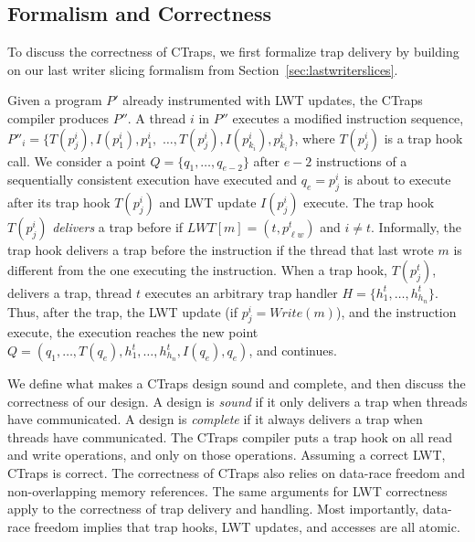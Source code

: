 \documentclass[preprint,9pt]{sigplanconf}
\newcommand{\ctraps}{CTraps\xspace}
\newcommand{\lwt}{LWT\xspace}
\begin{document}
\subsection{Formalism and Correctness}
\label{sec:ctsoundness}
To discuss the correctness of \ctraps, we first formalize trap delivery by
building on our last writer slicing formalism from
Section~\ref{sec:lastwriterslices}.  

Given a program $P'$ already instrumented with \lwt updates, the \ctraps
compiler produces $P''$. A thread $i$ in $P''$ executes a modified instruction
sequence, $P''_{i} = \{ T(p^{i}_{j}), I(p^{i}_{1}), p^{i}_{1},$ $\ldots,
T(p^{i}_{j}), I(p^{i}_{k_{i}}), p^{i}_{k_{i}} \}$, where $T(p^{i}_{j})$ is a
trap hook call.  We consider a point $Q = \{q_1, \ldots, q_{e-2}\}$ after $e-2$
instructions of a sequentially consistent execution have executed and $q_{e} =
p^{i}_{j}$ is about to execute after its trap hook $T(p^{i}_{j})$ and \lwt
update $I(p^{i}_{j})$ execute.  The trap hook $T(p^{i}_{j})$ {\em delivers} a
trap before if $LWT[m] = (t,p^{t}_{\ell w})$ and $i \ne t$.  Informally, the
trap hook delivers a trap before the instruction if the thread that last wrote
$m$ is different from the one executing the instruction.  When a trap hook,
$T(p^{t}_{j})$, delivers a trap, thread $t$ executes an arbitrary trap handler
$H = \{h^{t}_{1}, \ldots, h^{t}_{h_{n}}\}$.  Thus, after the trap, the \lwt
update (if $p^{i}_{j} = Write(m)$), and the instruction execute, the execution
reaches the new point $Q = (q_{1}, \ldots, T(q_{e}), h^{t}_{1}, \ldots,
h^{t}_{h_{n}}, I(q_{e}), q_{e})$, and continues.

We define what makes a \ctraps design sound and complete, and then discuss the
correctness of our design.  A design is {\em sound} if it only delivers a trap
when threads have communicated.  A design is {\em complete} if it always
delivers a trap when threads have communicated.  The \ctraps compiler puts a
trap hook on all read and write operations, and only on those operations.
Assuming a correct \lwt, \ctraps is correct.  The correctness of \ctraps also
relies on data-race freedom and non-overlapping memory references.  The same
arguments for \lwt correctness apply to the correctness of trap delivery and
handling.  Most importantly, data-race freedom implies that trap hooks, \lwt
updates, and accesses are all atomic.


\end{document}

